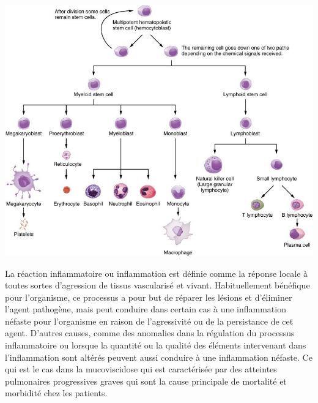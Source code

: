 \begin{center}
\includegraphics[scale=1]{gfx/inflammation.jpg} 
\captionsetup{type=figure}
       \label{inflammation}
\end{center}

La réaction inflammatoire ou inflammation est définie comme la réponse locale à toutes sortes d’agression de tissus vascularisé et vivant. Habituellement bénéfique pour l’organisme, ce processus a pour but de réparer les lésions et d’éliminer l’agent pathogène, mais peut conduire dans certain cas à une inflammation néfaste pour l’organisme en raison de l’agressivité ou de la persistance de cet agent. D’autres causes, comme des anomalies dans la régulation du processus inflammatoire ou lorsque la quantité ou la qualité des éléments intervenant dans l’inflammation sont altérés peuvent aussi conduire à une inflammation néfaste. Ce qui est le cas dans la mucoviscidose qui est caractérisée par des atteintes pulmonaires progressives graves qui sont la cause principale de mortalité et morbidité chez les patients.

